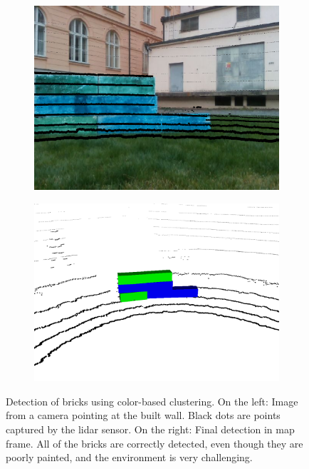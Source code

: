 \begin{figure}[H]
	
	\begin{subfigure}{0.49\textwidth}
		\centering
		\includegraphics[scale=0.19]{fig/colors_camera}
	\end{subfigure}
	\begin{subfigure}{0.49\textwidth}
		\centering
		\includegraphics[scale=0.18]{fig/colors_lidar}
	\end{subfigure}
	
	\caption[Colored pointcloud detections]{Detection of bricks using color-based clustering. On the left: Image from a camera pointing at the built wall. Black dots are points captured by the lidar sensor. On the right: Final detection in map frame. All of the bricks are correctly detected, even though they are poorly painted, and the environment is very challenging.}
	\label{fig:colors}
\end{figure}

\newpage
